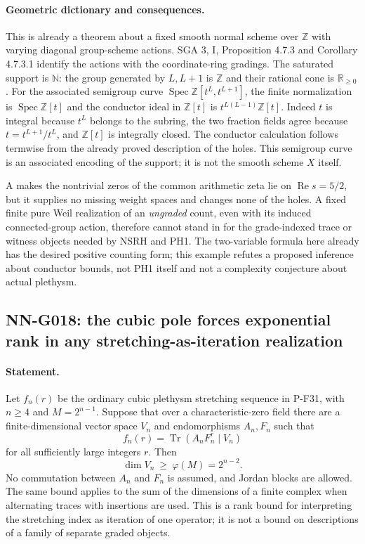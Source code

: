 \paragraph{Geometric dictionary and consequences.}
This is already a theorem about a fixed smooth normal scheme
over $\mathbb Z$ with varying diagonal group-scheme actions.
SGA 3, I, Proposition 4.7.3 and Corollary 4.7.3.1 identify
the actions with the coordinate-ring gradings. The saturated
support is $\mathbb N$: the group generated by $L,L+1$ is
$\mathbb Z$ and their rational cone is $\mathbb R_{\ge0}$.
For the associated semigroup curve
$\operatorname{Spec}\mathbb Z[t^L,t^{L+1}]$, the finite
normalization is $\operatorname{Spec}\mathbb Z[t]$ and the
conductor ideal in $\mathbb Z[t]$ is
$t^{L(L-1)}\mathbb Z[t]$. Indeed $t$ is integral because
$t^L$ belongs to the subring, the two fraction fields agree
because $t=t^{L+1}/t^L$, and $\mathbb Z[t]$ is integrally
closed. The conductor calculation follows termwise from the
already proved description of the holes. This semigroup
curve is an associated encoding of the support; it is not
the smooth scheme $X$ itself.

A makes the nontrivial zeros of the common arithmetic zeta
lie on $\operatorname{Re}s=5/2$, but it supplies no missing
weight spaces and changes none of the holes. A fixed finite
pure Weil realization of an \emph{ungraded} count, even with
its induced connected-group action, therefore cannot stand
in for the grade-indexed trace or witness objects needed by
NSRH and PH1. The two-variable formula here already has
the desired positive counting form; this example refutes a
proposed inference about conductor bounds, not PH1 itself
and not a complexity conjecture about actual plethysm.

\subsection{NN-G018: the cubic pole forces exponential rank in any stretching-as-iteration realization}
\paragraph{Statement.}
Let $f_n(r)$ be the ordinary cubic plethysm stretching sequence
in P-F31, with $n\ge4$ and $M=2^{n-1}$. Suppose that over a
characteristic-zero field there are a finite-dimensional vector
space $V_n$ and endomorphisms $A_n,F_n$ such that
\[
f_n(r)=\operatorname{Tr}(A_nF_n^r\mid V_n)
\]
for all sufficiently large integers $r$. Then
\[
\dim V_n\ \ge\ \varphi(M)=2^{n-2}.
\tag{G018.1}
\]
No commutation between $A_n$ and $F_n$ is assumed, and Jordan
blocks are allowed. The same bound applies to the sum of the
dimensions of a finite complex when alternating traces with
insertions are used. This is a rank bound for interpreting the
stretching index as iteration of one operator; it is not a
bound on descriptions of a family of separate graded objects.

